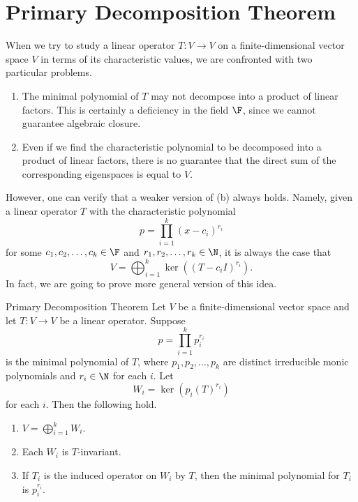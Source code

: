 \documentclass[linearalgebraII]{subfiles}
\begin{document}
    \section{Primary Decomposition Theorem}
    
    \begin{remark}
        When we try to study a linear operator $T:V\to V$ on a finite-dimensional vector space $V$ in terms of its characteristic values, we are confronted with two particular problems.
        \begin{enumerate}
            \item The minimal polynomial of $T$ may not decompose into a product of linear factors. This is certainly a deficiency in the field $\F$, since we cannot guarantee algebraic closure. 
            \item Even if we find the characteristic polynomial to be decomposed into a product of linear factors, there is no guarantee that the direct sum of the corresponding eigenspaces is equal to $V$.
        \end{enumerate}
        However, one can verify that a weaker version of (b) always holds. Namely, given a linear operator $T$ with the characteristic polynomial
        \begin{equation*}
            p = \prod^{k}_{i=1} (x-c_i)^{r_i}
        \end{equation*}
        for some $c_1,c_2,\ldots,c_k\in\F$ and $r_1,r_2,\ldots,r_k\in\N$, it is always the case that
        \begin{equation*}
            V = \bigoplus^{k}_{i=1} \ker\left( \left( T-c_iI \right)^{r_i} \right).
        \end{equation*}
        In fact, we are going to prove more general version of this idea.
    \end{remark}

    \clearpage
    \begin{theorem}{Primary Decomposition Theorem}
        Let $V$ be a finite-dimensional vector space and let $T:V\to V$ be a linear operator. Suppose
        \begin{equation*}
            p = \prod^{k}_{i=1} p_i^{r_i}
        \end{equation*}
        is the minimal polynomial of $T$, where $p_1, p_2, \ldots, p_k$ are distinct irreducible monic polynomials and $r_i\in \N$ for each $i$. Let
        \begin{equation*}
            W_i = \ker\left( p_i(T)^{r_i} \right) 
        \end{equation*}
        for each $i$. Then the following hold.
        \begin{enumerate}
            \item $V = \bigoplus^{k}_{i=1} W_i$.
            \item Each $W_i$ is $T$-invariant.
            \item If $T_i$ is the induced operator on $W_i$ by $T$, then the minimal polynomial for $T_i$ is $p_i^{r_i}$.
        \end{enumerate}
    \end{theorem}
\end{document}
